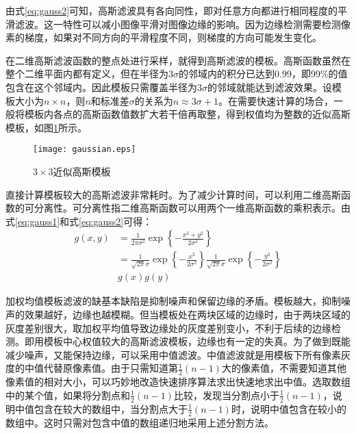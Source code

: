 由式\eqref{eq:gauss2}可知，高斯滤波具有各向同性，即对任意方向都进行相同程度的平滑滤波。这一特性可以减小图像平滑对图像边缘的影响。因为边缘检测需要检测像素的梯度，如果对不同方向的平滑程度不同，则梯度的方向可能发生变化。

在二维高斯滤波函数的整点处进行采样，就得到高斯滤波的模板。高斯函数虽然在整个二维平面内都有定义，但在半径为$3\sigma$的邻域内的积分已达到0.99，即99\%的值包含在这个邻域内。因此模板只需覆盖半径为$3\sigma$的邻域就能达到滤波效果。设模板大小为$n\times n$，则$n$和标准差$\sigma$的关系为$n\approx 3\sigma+1$。在需要快速计算的场合，一般将模板内各点的高斯函数值数扩大若干倍再取整，得到权值均为整数的近似高斯模板，如图\ref{fig:gaussian}所示。
\begin{figure}[!h]
  \centering
  \texttt{[image: gaussian.eps]}
  \caption{$3\times 3$近似高斯模板}
  \label{fig:gaussian}
\end{figure}

直接计算模板较大的高斯滤波非常耗时。为了减少计算时间，可以利用二维高斯函数的可分离性。可分离性指二维高斯函数可以用两个一维高斯函数的乘积表示。由式\eqref{eq:gauss1}和式\eqref{eq:gauss2}可得：
\begin{equation}
  \label{eq:sep}
  \begin{array}{rl}
    g(x,y) &= \frac{1}{2\pi\sigma^2}\exp\left\{-\frac{x^2+y^2}{2\sigma^2}\right\} \\
    &= \frac{1}{\sqrt{2\pi}\sigma}\exp\left\{-\frac{x^2}{2\sigma^2}\right\}\frac{1}{\sqrt{2\pi}\sigma}\exp\left\{-\frac{y^2}{2\sigma^2}\right\} \\
    &g(x)g(y)
  \end{array}
\end{equation}

加权均值模板滤波的缺基本缺陷是抑制噪声和保留边缘的矛盾。模板越大，抑制噪声的效果越好，边缘也越模糊。但当模板处在两块区域的边缘时，由于两块区域的灰度差别很大，取加权平均值导致边缘处的灰度差别变小，不利于后续的边缘检测。即用模板中心权值较大的高斯滤波模板，边缘也有一定的失真。为了做到既能减少噪声，又能保持边缘，可以采用中值滤波。中值滤波就是用模板下所有像素灰度的中值代替原像素值。由于只需知道第$\frac{1}{2}(n-1)$大的像素值，不需要知道其他像素值的相对大小，可以巧妙地改造快速排序算法求出快速地求出中值。选取数组中的某个值，如果将分割点和$\frac{1}{2}(n-1)$比较，发现当分割点小于$\frac{1}{2}(n-1)$，说明中值包含在较大的数组中，当分割点大于$\frac{1}{2}(n-1)$时，说明中值包含在较小的数组中。这时只需对包含中值的数组递归地采用上述分割方法。

